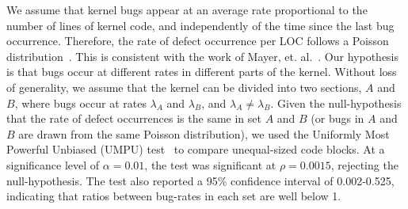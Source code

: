 We assume that kernel bugs appear at an average rate proportional to the
number of lines of kernel code, and independently of the time since the last
bug occurrence. Therefore, the rate of defect occurrence per LOC
follows a Poisson distribution~\cite{Poisson-distribution}.
This is consistent with the work of Mayer, et. al.~\cite{mayer1989probability}.
Our hypothesis is that bugs occur at different rates in different parts of the kernel. Without
loss of generality, we assume that the kernel can be divided into two sections,
$A$ and $B$, where bugs occur at rates $\lambda_A$ and
$\lambda_B$, and $\lambda_A \neq \lambda_B$. Given the null-hypothesis
that the rate of defect occurrences is the same in set $A$ and $B$
(or bugs in $A$ and $B$ are drawn from the same Poisson distribution),
we used the Uniformly Most Powerful Unbiased (UMPU) test~\cite{shiue1982experiment}
to compare unequal-sized code blocks.
At a significance level of $\alpha=0.01$, the test was significant at
$\rho=0.0015$, rejecting the null-hypothesis.
The test also reported a 95\% confidence interval of
0.002-0.525, indicating that ratios between bug-rates in each set are well
below 1. 

